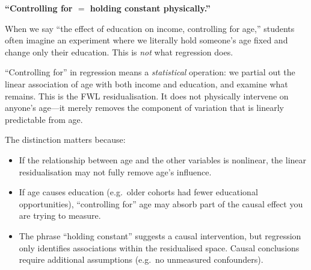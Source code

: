 \begin{misconception}
\textbf{``Controlling for $=$ holding constant physically.''}

When we say ``the effect of education on income, controlling for age,''
students often imagine an experiment where we literally hold someone's
age fixed and change only their education.
This is \emph{not} what regression does.

``Controlling for'' in regression means a \emph{statistical} operation:
we partial out the linear association of age with both income and
education, and examine what remains.
This is the FWL residualisation.
It does not physically intervene on anyone's age---it merely
removes the component of variation that is linearly predictable
from age.

The distinction matters because:
\begin{itemize}[nosep]
  \item If the relationship between age and the other variables is
        nonlinear, the linear residualisation may not fully remove
        age's influence.
  \item If age causes education (e.g.\ older cohorts had fewer
        educational opportunities), ``controlling for'' age may
        absorb part of the causal effect you are trying to measure.
  \item The phrase ``holding constant'' suggests a causal
        intervention, but regression only identifies associations
        within the residualised space. Causal conclusions require
        additional assumptions (e.g.\ no unmeasured confounders).
\end{itemize}
\end{misconception}



